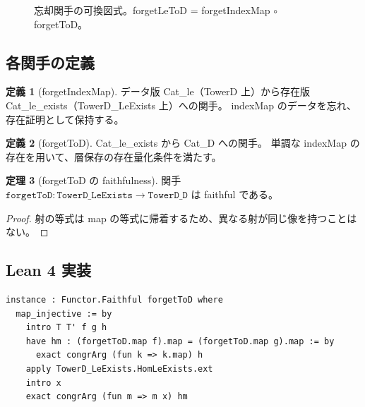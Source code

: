 \documentclass{ltjsarticle}
\theoremstyle{definition}
\newtheorem{definition}{定義}[section]
\newtheorem{theorem}[definition]{定理}
\begin{document}
\begin{figure}[htbp]
\centering
{}
\caption{忘却関手の可換図式。forgetLeToD = forgetIndexMap $\circ$ forgetToD。}
\label{fig:forgetful-functors}
\end{figure}

\subsection{各関手の定義}

\begin{definition}[forgetIndexMap]
データ版 Cat\_le（TowerD 上）から存在版 Cat\_le\_exists（TowerD\_LeExists 上）への関手。
indexMap のデータを忘れ、存在証明として保持する。
\end{definition}

\begin{definition}[forgetToD]
Cat\_le\_exists から Cat\_D への関手。
単調な indexMap の存在を用いて、層保存の存在量化条件を満たす。
\end{definition}

\begin{theorem}[forgetToD の faithfulness]
関手 $\texttt{forgetToD}: \texttt{TowerD\_LeExists} \to \texttt{TowerD\_D}$ は faithful である。
\end{theorem}

\begin{proof}
射の等式は map の等式に帰着するため、異なる射が同じ像を持つことはない。
\end{proof}

\subsection{Lean 4 実装}

\begin{leanbox}
\begin{lstlisting}
instance : Functor.Faithful forgetToD where
  map_injective := by
    intro T T' f g h
    have hm : (forgetToD.map f).map = (forgetToD.map g).map := by
      exact congrArg (fun k => k.map) h
    apply TowerD_LeExists.HomLeExists.ext
    intro x
    exact congrArg (fun m => m x) hm
\end{lstlisting}
\end{leanbox}
\end{document}
